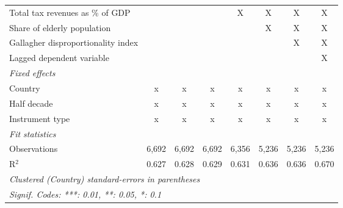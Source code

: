 \begin{table}[htbp]
\begin{tabular}{lccccccc}
      Total tax revenues as \% of GDP                                                          &              &               &               & X            & X       & X       & X\\  
      Share of elderly population                                                              &              &               &               &              & X       & X       & X\\  
      Gallagher disproportionality index                                                       &              &               &               &              &         & X       & X\\  
      Lagged dependent variable                                                                &              &               &               &              &         &         & X\\  
      \emph{Fixed effects}\\
      Country                                                                                  & x            & x             & x             & x            & x       & x       & x\\  
      Half decade                                                                              & x            & x             & x             & x            & x       & x       & x\\  
      Instrument type                                                                          & x            & x             & x             & x            & x       & x       & x\\  
      \midrule \emph{Fit statistics}\\
      Observations                                                                             & 6,692        & 6,692         & 6,692         & 6,356        & 5,236   & 5,236   & 5,236\\  
      R$^2$                                                                                    & 0.627        & 0.628         & 0.629         & 0.631        & 0.636   & 0.636   & 0.670\\  
      \midrule
      \multicolumn{8}{l}{\emph{Clustered (Country) standard-errors in parentheses}}\\
      \multicolumn{8}{l}{\emph{Signif. Codes: ***: 0.01, **: 0.05, *: 0.1}}\\
   \end{tabular}
\end{table}


